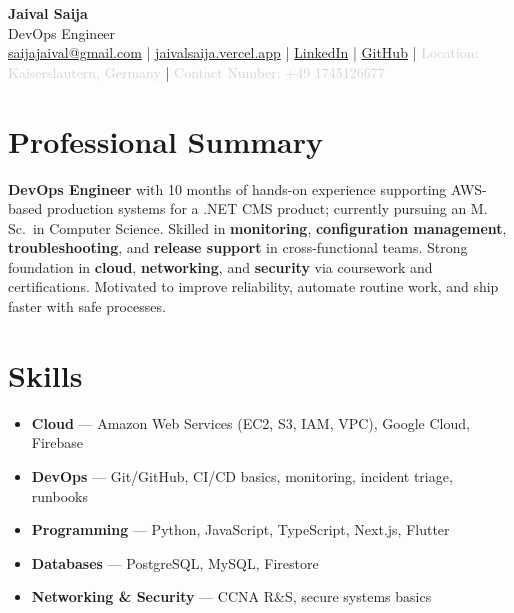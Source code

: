 \documentclass[11pt,a4paper]{article}
\newcommand{\dotnet}{\mbox{.NET}}
\begin{document}
\frenchspacing
{}
\setlength{\emergencystretch}{6em}
\sloppy

\begin{center}
\begin{minipage}{0.92\textwidth}
\centering
    {\Huge\bfseries Jaival Saija}\\[1pt]
    {\large DevOps Engineer}\\[3pt]
    {\small
    \href{mailto:saijajaival@gmail.com}{saijajaival@gmail.com} \quad | \quad
    \href{https://jaivalsaija.vercel.app}{jaivalsaija.vercel.app} \quad | \quad
    \href{https://linkedin.com/in/jaivalsaija}{LinkedIn} \quad | \quad
    \href{https://github.com/Jaival}{GitHub} \quad | \quad
    \textcolor{lightgray}{Location: Kaiserslautern, Germany} \quad | \quad
    \textcolor{lightgray}{Contact Number: +49 1745126677}
    }
\end{minipage}
\end{center}

\vspace{4pt}

\section*{Professional Summary}
{\normalsize\textbf{DevOps Engineer} with 10 months of hands-on experience supporting AWS-based production systems for a \dotnet{} CMS product; currently pursuing an M.\,Sc.\ in Computer Science. Skilled in \textbf{monitoring}, \textbf{configuration management}, \textbf{troubleshooting}, and \textbf{release support} in cross-functional teams. Strong foundation in \textbf{cloud}, \textbf{networking}, and \textbf{security} via coursework and certifications. Motivated to improve reliability, automate routine work, and ship faster with safe processes.}

\section*{Skills}
{\small
\begin{itemize}
    \item \textbf{Cloud} — Amazon Web Services (EC2, S3, IAM, VPC), Google Cloud, Firebase
    \item \textbf{DevOps} — Git/GitHub, CI/CD basics, monitoring, incident triage, runbooks
    \item \textbf{Programming} — Python, JavaScript, TypeScript, Next.js, Flutter
    \item \textbf{Databases} — PostgreSQL, MySQL, Firestore
    \item \textbf{Networking \& Security} — CCNA R\&S, secure systems basics
\end{itemize}}
\end{document}
